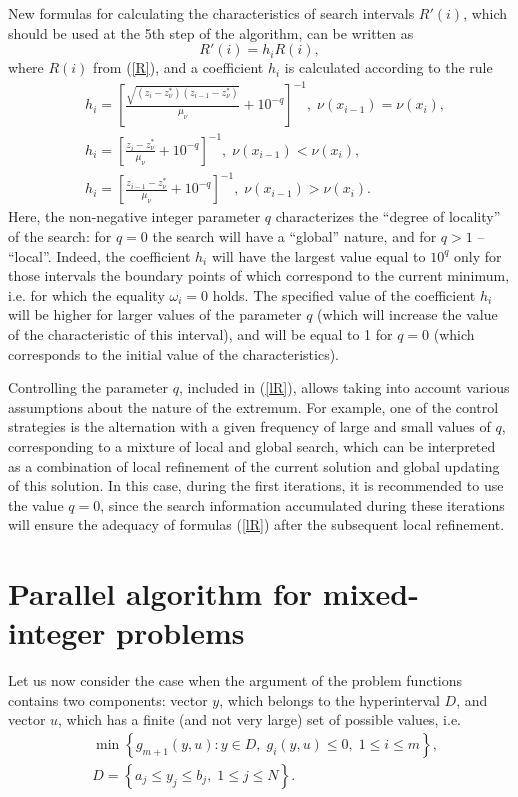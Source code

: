 \documentclass[
11pt,%
tightenlines,%
twoside,%
onecolumn,%
nofloats,%
nobibnotes,%
nofootinbib,%
superscriptaddress,%
noshowpacs,%
centertags]%
{revtex4}
\begin{document}
New formulas for calculating the characteristics of search intervals $R'(i)$, which should be used at the 5th step of the algorithm, can be written as
\[
R'(i) = h_i R(i),
\]
where $R(i)$ from (\ref{R}), and a coefficient $h_i$ is calculated  according to the rule
\begin{eqnarray}\label{lR}
& h_i = \left[\frac{\sqrt{(z_i-z_\nu^*)(z_{i-1}-z_\nu^*)}}{\mu_\nu}+10^{-q}\right]^{-1}, \; \nu(x_{i-1})=\nu(x_{i}),\nonumber\\
& h_i = \left[\frac{z_i-z_\nu^*}{\mu_\nu}+10^{-q}\right]^{-1}, \; \nu(x_{i-1})<\nu(x_{i}),\\
& h_i = \left[\frac{z_{i-1}-z_\nu^*}{\mu_\nu}+10^{-q}\right]^{-1}, \; \nu(x_{i-1})>\nu(x_{i}).\nonumber
\end{eqnarray}
Here, the non-negative integer parameter $q$ characterizes the ``degree of locality'' of the search: for $q=0$ the search will have a ``global'' nature, and for $q>1$ -- ``local''. 
Indeed, the coefficient $h_i$ will have the largest value equal to $10^q$ only for those intervals the boundary points of which correspond to the current minimum, i.e. for which the equality $\omega_i = 0$ holds. The specified value of the coefficient $h_i$ will be higher for larger values of the parameter $q$ (which will increase the value of the characteristic of this interval), and will be equal to 1 for $q=0$ (which corresponds to the initial value of the characteristics). 

Controlling the parameter $q$, included in (\ref{lR}), allows taking into account various assumptions about the nature of the extremum. For example, one of the control strategies is the alternation with a given frequency of large and small values of $q$, corresponding to a mixture of local and global search, which can be interpreted as a combination of local refinement of the current solution and global updating of this solution. In this case, during the first iterations, it is recommended to use the value $q=0$, since the search information accumulated during these iterations will ensure the adequacy of formulas (\ref{lR}) after the subsequent local refinement.


\section{Parallel algorithm for mixed-integer problems}

Let us now consider the case when the argument of the problem functions contains two components: vector $y$, which belongs to the hyperinterval $D$, and vector $u$, which has a finite (and not very large) set of possible values, i.e.
\begin{eqnarray}\label{problem_i}
& \min{\left\{ g_{m+1}(y,u):y\in D, \; g_i(y,u)\leq 0, \; 1 \leq i \leq m\right\}},\\
& D=\left\{a_j\leq y_j \leq b_j, \; 1\leq j \leq N \right\}.\nonumber
\end{eqnarray}
\end{document}
